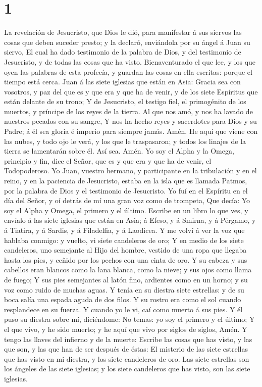 \hypertarget{section}{%
\section{1}\label{section}}

 La revelación de Jesucristo, que Dios le dió, para
manifestar á sus siervos las cosas que deben suceder presto; y la
declaró, enviándola por su ángel á Juan su siervo,  El cual
ha dado testimonio de la palabra de Dios, y del testimonio de
Jesucristo, y de todas las cosas que ha visto. 
Bienaventurado el que lee, y los que oyen las palabras de esta profecía,
y guardan las cosas en ella escritas: porque el tiempo está cerca.
 Juan á las siete iglesias que están en Asia: Gracia sea con
vosotros, y paz del que es y que era y que ha de venir, y de los siete
Espíritus que están delante de su trono;  Y de Jesucristo,
el testigo fiel, el primogénito de los muertos, y príncipe de los reyes
de la tierra. Al que nos amó, y nos ha lavado de nuestros pecados con su
sangre,  Y nos ha hecho reyes y sacerdotes para Dios y su
Padre; á él sea gloria é imperio para siempre jamás. Amén. 
He aquí que viene con las nubes, y todo ojo le verá, y los que le
traspasaron; y todos los linajes de la tierra se lamentarán sobre él.
Así sea. Amén.  Yo soy el Alpha y la Omega, principio y fin,
dice el Señor, que es y que era y que ha de venir, el Todopoderoso.
 Yo Juan, vuestro hermano, y participante en la tribulación
y en el reino, y en la paciencia de Jesucristo, estaba en la isla que es
llamada Patmos, por la palabra de Dios y el testimonio de Jesucristo.
 Yo fuí en el Espíritu en el día del Señor, y oí detrás de
mí una gran voz como de trompeta,  Que decía: Yo soy el
Alpha y Omega, el primero y el último. Escribe en un libro lo que ves, y
envíalo á las siete iglesias que están en Asia; á Efeso, y á Smirna, y á
Pérgamo, y á Tiatira, y á Sardis, y á Filadelfia, y á Laodicea.
 Y me volví á ver la voz que hablaba conmigo: y vuelto, vi
siete candeleros de oro;  Y en medio de los siete
candeleros, uno semejante al Hijo del hombre, vestido de una ropa que
llegaba hasta los pies, y ceñido por los pechos con una cinta de oro.
 Y su cabeza y sus cabellos eran blancos como la lana
blanca, como la nieve; y sus ojos como llama de fuego;  Y
sus pies semejantes al latón fino, ardientes como en un horno; y su voz
como ruido de muchas aguas.  Y tenía en su diestra siete
estrellas: y de su boca salía una espada aguda de dos filos. Y su rostro
era como el sol cuando resplandece en su fuerza.  Y cuando
yo le vi, caí como muerto á sus pies. Y él puso su diestra sobre mí,
diciéndome: No temas: yo soy el primero y el último;  Y el
que vivo, y he sido muerto; y he aquí que vivo por siglos de siglos,
Amén. Y tengo las llaves del infierno y de la muerte: 
Escribe las cosas que has visto, y las que son, y las que han de ser
después de éstas:  El misterio de las siete estrellas que
has visto en mi diestra, y los siete candeleros de oro. Las siete
estrellas son los ángeles de las siete iglesias; y los siete candeleros
que has visto, son las siete iglesias.

